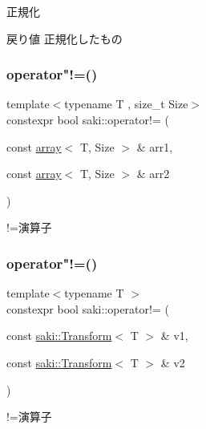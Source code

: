 正規化 

\begin{DoxyReturn}{戻り値}
正規化したもの 
\end{DoxyReturn}
\mbox{\label{namespacesaki_aed742cc915a830fea9f4993c0a031c45}} 
\subsubsection{\texorpdfstring{operator"!=()}{operator!=()}\hspace{0.1cm}{\footnotesize\ttfamily [1/11]}}
{\footnotesize\ttfamily template$<$typename T , size\+\_\+t Size$>$ \\
constexpr bool saki\+::operator!= (\begin{DoxyParamCaption}\item[{const \mbox{\hyperlink{classsaki_1_1array}{array}}$<$ T, Size $>$ \&}]{arr1,  }\item[{const \mbox{\hyperlink{classsaki_1_1array}{array}}$<$ T, Size $>$ \&}]{arr2 }\end{DoxyParamCaption})}



!=演算子 

\mbox{\label{namespacesaki_aeb1efde4ebc127c358fe17c9725fc622}} 
\subsubsection{\texorpdfstring{operator"!=()}{operator!=()}\hspace{0.1cm}{\footnotesize\ttfamily [2/11]}}
{\footnotesize\ttfamily template$<$typename T $>$ \\
constexpr bool saki\+::operator!= (\begin{DoxyParamCaption}\item[{const \mbox{\hyperlink{classsaki_1_1_transform}{saki\+::\+Transform}}$<$ T $>$ \&}]{v1,  }\item[{const \mbox{\hyperlink{classsaki_1_1_transform}{saki\+::\+Transform}}$<$ T $>$ \&}]{v2 }\end{DoxyParamCaption})}



!=演算子 

\mbox{\label{namespacesaki_aa8b0dcab7f268e88f01c92c95cd12135}} 
